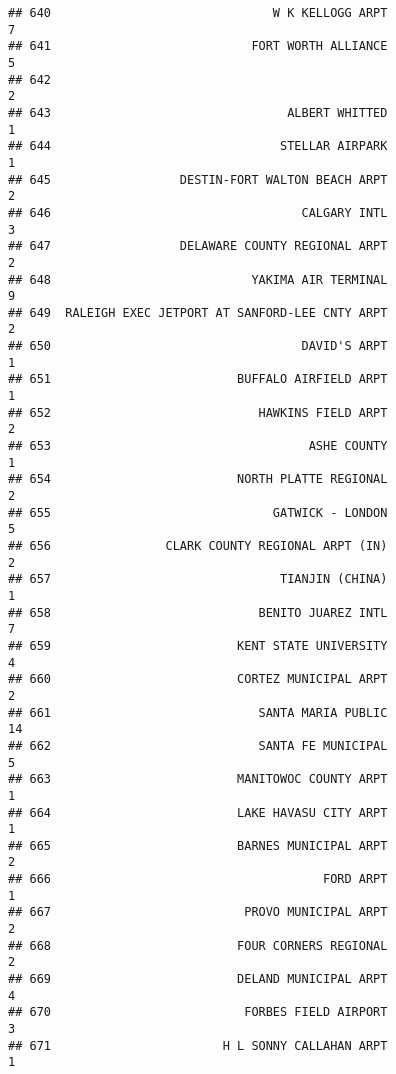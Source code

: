 \documentclass[
]{article}
\begin{document}
\begin{verbatim}
## 640                               W K KELLOGG ARPT                           7
## 641                            FORT WORTH ALLIANCE                           5
## 642                                                                          2
## 643                                 ALBERT WHITTED                           1
## 644                                STELLAR AIRPARK                           1
## 645                  DESTIN-FORT WALTON BEACH ARPT                           2
## 646                                   CALGARY INTL                           3
## 647                  DELAWARE COUNTY REGIONAL ARPT                           2
## 648                            YAKIMA AIR TERMINAL                           9
## 649  RALEIGH EXEC JETPORT AT SANFORD-LEE CNTY ARPT                           2
## 650                                   DAVID'S ARPT                           1
## 651                          BUFFALO AIRFIELD ARPT                           1
## 652                             HAWKINS FIELD ARPT                           2
## 653                                    ASHE COUNTY                           1
## 654                          NORTH PLATTE REGIONAL                           2
## 655                               GATWICK - LONDON                           5
## 656                CLARK COUNTY REGIONAL ARPT (IN)                           2
## 657                                TIANJIN (CHINA)                           1
## 658                             BENITO JUAREZ INTL                           7
## 659                          KENT STATE UNIVERSITY                           4
## 660                          CORTEZ MUNICIPAL ARPT                           2
## 661                             SANTA MARIA PUBLIC                          14
## 662                             SANTA FE MUNICIPAL                           5
## 663                          MANITOWOC COUNTY ARPT                           1
## 664                          LAKE HAVASU CITY ARPT                           1
## 665                          BARNES MUNICIPAL ARPT                           2
## 666                                      FORD ARPT                           1
## 667                           PROVO MUNICIPAL ARPT                           2
## 668                          FOUR CORNERS REGIONAL                           2
## 669                          DELAND MUNICIPAL ARPT                           4
## 670                           FORBES FIELD AIRPORT                           3
## 671                        H L SONNY CALLAHAN ARPT                           1

\end{verbatim}
\end{document}
